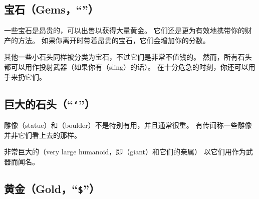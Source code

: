 \documentclass[a4paper, 10pt]{article}
\begin{document}
\subsection*{宝石（Gems，“{\tt *}”）}

一些宝石是昂贵的，可以出售以获得大量黄金。
它们还是更为有效地携带你的财产的方法。
如果你离开时带着昂贵的宝石，它们会增加你的分数。

其他一些小石头同样被分类为宝石，不过它们是非常不值钱的。
然而，所有石头都可以用作投射武器（如果你有\zhTransSling{}（sling）的话）。
在十分危急的时刻，你还可以用手来扔它们。

\subsection*{巨大的石头（“{\tt `}”）}
雕像（statue）和\zhTransBoulders（boulder）不是特别有用，并且通常很重。
有传闻称一些雕像并非它们看上去的那样。

非常巨大的\zhTransHumanoid（very large humanoid，即\zhTransGiant（giant）和它们的亲属）
以它们用\zhTransBoulders{}作为武器而闻名。

\subsection*{黄金（Gold，“{\tt \$}”）}
\end{document}
